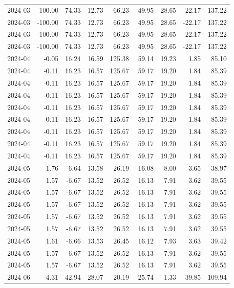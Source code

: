 \begin{table}[ht]
\begin{tabular}{lrrrrrrrr}
  2024-03 & -100.00 & 74.33 & 12.73 & 66.23 & 49.95 & 28.65 & -22.17 & 137.22 \\ 
  2024-03 & -100.00 & 74.33 & 12.73 & 66.23 & 49.95 & 28.65 & -22.17 & 137.22 \\ 
  2024-03 & -100.00 & 74.33 & 12.73 & 66.23 & 49.95 & 28.65 & -22.17 & 137.22 \\ 
  2024-03 & -100.00 & 74.33 & 12.73 & 66.23 & 49.95 & 28.65 & -22.17 & 137.22 \\ 
  2024-04 & -0.05 & 16.24 & 16.59 & 125.38 & 59.14 & 19.23 & 1.85 & 85.10 \\ 
  2024-04 & -0.11 & 16.23 & 16.57 & 125.67 & 59.17 & 19.20 & 1.84 & 85.39 \\ 
  2024-04 & -0.11 & 16.23 & 16.57 & 125.67 & 59.17 & 19.20 & 1.84 & 85.39 \\ 
  2024-04 & -0.11 & 16.23 & 16.57 & 125.67 & 59.17 & 19.20 & 1.84 & 85.39 \\ 
  2024-04 & -0.11 & 16.23 & 16.57 & 125.67 & 59.17 & 19.20 & 1.84 & 85.39 \\ 
  2024-04 & -0.11 & 16.23 & 16.57 & 125.67 & 59.17 & 19.20 & 1.84 & 85.39 \\ 
  2024-04 & -0.11 & 16.23 & 16.57 & 125.67 & 59.17 & 19.20 & 1.84 & 85.39 \\ 
  2024-04 & -0.11 & 16.23 & 16.57 & 125.67 & 59.17 & 19.20 & 1.84 & 85.39 \\ 
  2024-04 & -0.11 & 16.23 & 16.57 & 125.67 & 59.17 & 19.20 & 1.84 & 85.39 \\ 
  2024-05 & 1.76 & -6.64 & 13.58 & 26.19 & 16.08 & 8.00 & 3.65 & 38.97 \\ 
  2024-05 & 1.57 & -6.67 & 13.52 & 26.52 & 16.13 & 7.91 & 3.62 & 39.55 \\ 
  2024-05 & 1.57 & -6.67 & 13.52 & 26.52 & 16.13 & 7.91 & 3.62 & 39.55 \\ 
  2024-05 & 1.57 & -6.67 & 13.52 & 26.52 & 16.13 & 7.91 & 3.62 & 39.55 \\ 
  2024-05 & 1.57 & -6.67 & 13.52 & 26.52 & 16.13 & 7.91 & 3.62 & 39.55 \\ 
  2024-05 & 1.57 & -6.67 & 13.52 & 26.52 & 16.13 & 7.91 & 3.62 & 39.55 \\ 
  2024-05 & 1.61 & -6.66 & 13.53 & 26.45 & 16.12 & 7.93 & 3.63 & 39.42 \\ 
  2024-05 & 1.57 & -6.67 & 13.52 & 26.52 & 16.13 & 7.91 & 3.62 & 39.55 \\ 
  2024-05 & 1.57 & -6.67 & 13.52 & 26.52 & 16.13 & 7.91 & 3.62 & 39.55 \\ 
  2024-06 & -4.31 & 42.94 & 28.07 & 20.19 & -25.74 & 1.33 & -39.85 & 109.94 \\ 

\end{tabular}
\end{table}
